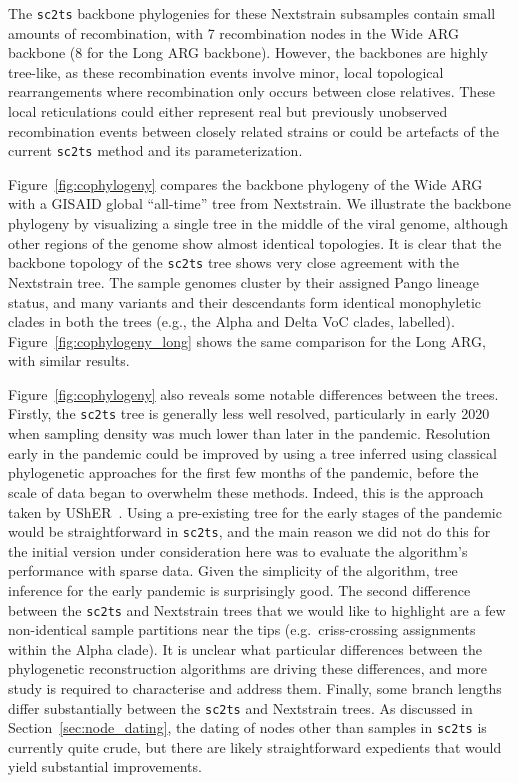 \documentclass{article}
\begin{document}
The \texttt{sc2ts} backbone phylogenies for these Nextstrain subsamples contain small amounts of recombination,
with 7 recombination nodes in the Wide ARG backbone (8 for the Long ARG
backbone). However, the backbones are highly tree-like, as these
recombination events involve minor, local topological rearrangements
where recombination only occurs between close relatives.
These local reticulations could either represent
real but previously unobserved recombination events between closely related strains
or could be artefacts of the current \texttt{sc2ts} method and its parameterization.

Figure~\ref{fig:cophylogeny} compares the backbone phylogeny of the Wide ARG with
a GISAID global ``all-time'' tree from Nextstrain.
We illustrate the backbone phylogeny by visualizing
a single tree in the middle of the viral genome,
although other regions of the
genome show almost identical topologies.
It is clear that the backbone topology of the \texttt{sc2ts} tree shows very close
agreement with the Nextstrain tree. The sample genomes cluster by their
assigned Pango lineage status, and many variants and their descendants form
identical monophyletic clades in both the trees (e.g., the Alpha and Delta VoC
clades, labelled).
Figure~\ref{fig:cophylogeny_long} shows the same comparison for the Long ARG, with similar results.

Figure~\ref{fig:cophylogeny} also reveals some notable differences between the
trees. Firstly, the \texttt{sc2ts} tree is generally less well resolved,
particularly in early 2020 when sampling density was much lower than
later in the pandemic. Resolution early in the pandemic could be improved
by using a tree inferred using classical phylogenetic
approaches for the first few months of the pandemic, before the scale of
data began to overwhelm these methods. Indeed, this is the approach
taken by UShER~\citep{Turakhia2021-ur}. Using a pre-existing tree for
the early stages of the pandemic would be straightforward in \texttt{sc2ts},
and the main reason we did not do this for the initial
version under consideration here was to evaluate the algorithm's
performance with sparse data. Given
the simplicity of the algorithm, tree inference for the early pandemic
is surprisingly good.
The second difference between the \texttt{sc2ts} and Nextstrain trees
that we would like to highlight are a few non-identical sample partitions
near the tips (e.g.\ criss-crossing assignments within the Alpha clade). It is unclear what
particular differences between the phylogenetic reconstruction algorithms are driving these
differences, and more study is required to characterise and address them.
Finally, some branch lengths differ substantially between the \texttt{sc2ts}
and Nextstrain trees.
As discussed in Section~\ref{sec:node_dating}, the dating of nodes
other than samples in \texttt{sc2ts} is currently quite crude,
but there are likely straightforward expedients that would yield
substantial improvements.
\end{document}
